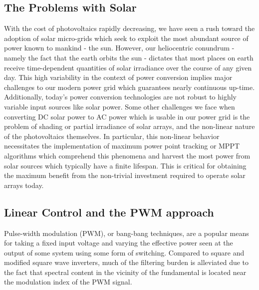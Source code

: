 \subsection{The Problems with Solar}
With the cost of photovoltaics rapidly decreasing, we have seen a rush toward the adoption of solar micro-grids which seek to exploit the most abundant source of power known to mankind - the sun. However, our heliocentric conundrum - namely the fact that the earth orbits the sun - dictates that most places on earth receive time-dependent quantities of solar irradiance over the course of any given day. This high variability in the context of power conversion implies major challenges to our modern power grid which guarantees nearly continuous up-time. Additionally, today's power conversion technologies are not robust to highly variable input sources like solar power. Some other challenges we face when converting DC solar power to AC power which is usable in our power grid is the problem of shading or partial irradiance of solar arrays, and the non-linear nature of the photovoltaics themselves. In particular, this non-linear behavior necessitates the implementation of maximum power point tracking or MPPT algorithms which comprehend this phenomena and harvest the most power from solar sources which typically have a finite lifespan. This is critical for obtaining the maximum benefit from the non-trivial investment required to operate solar arrays today. 

\subsection{Linear Control and the PWM approach}
Pulse-width modulation (PWM), or bang-bang techniques, are a popular means for taking a fixed input voltage and varying the effective power seen at the output of some system using some form of switching. Compared to square and modified square wave inverters, much of the filtering burden is alleviated due to the fact that spectral content in the vicinity of the fundamental is located near the modulation index of the PWM signal. 

